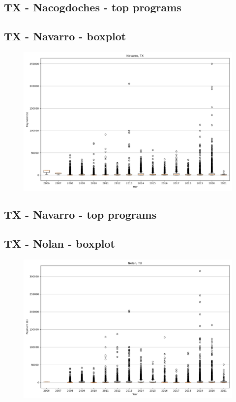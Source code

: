 \subsection*{TX - Nacogdoches - top programs}

\newpage
\subsection*{TX - Navarro - boxplot}
\begin{figure}[h]
\centering
\includegraphics[width=7in]{../output/boxplots/counties/Navarro-TX_boxplot.png}
\end{figure}


\subsection*{TX - Navarro - top programs}

\newpage
\subsection*{TX - Nolan - boxplot}
\begin{figure}[h]
\centering
\includegraphics[width=7in]{../output/boxplots/counties/Nolan-TX_boxplot.png}
\end{figure}


